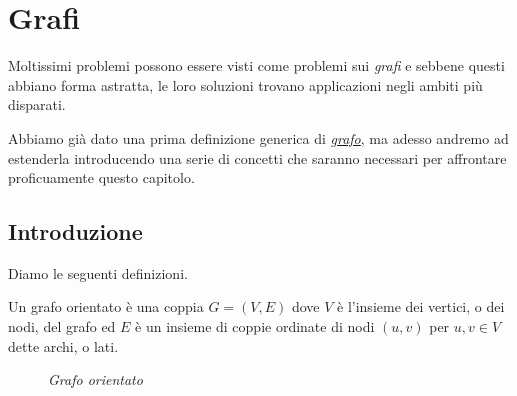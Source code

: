 \chapter{Grafi}
Moltissimi problemi possono essere visti come problemi sui \emph{grafi} e
sebbene questi abbiano forma astratta, le loro soluzioni trovano applicazioni
negli ambiti più disparati.

Abbiamo già dato una prima definizione generica di \hyperref[def:30]{\emph{grafo}},
ma adesso andremo ad estenderla introducendo una serie di concetti che saranno
necessari per affrontare proficuamente questo capitolo.

\section{Introduzione}
Diamo le seguenti definizioni.

\begin{definition}
    Un grafo orientato è una coppia $G=(V,E)$ dove $V$ è l'insieme dei vertici,
    o dei nodi, del grafo ed $E$ è un insieme di coppie ordinate di nodi $(u,v)$
    per $u,v\in V$ dette archi, o lati.
\end{definition}
\begin{figure}[ht]
    \centering
    \hfill
    \caption{\emph{Grafo orientato}}
\end{figure}

